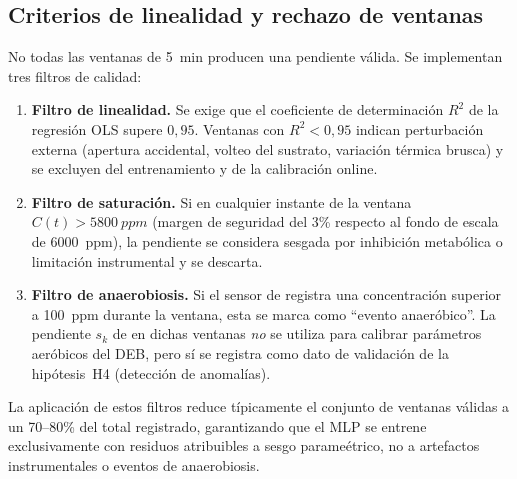 \subsection{Criterios de linealidad y rechazo de ventanas}

No todas las ventanas de \SI{5}{\minute} producen una pendiente válida. Se implementan tres filtros de calidad:

\begin{enumerate}
\item \textbf{Filtro de linealidad.} Se exige que el coeficiente de determinación $R^2$ de la regresión OLS supere $0{,}95$. Ventanas con $R^2 < 0{,}95$ indican perturbación externa (apertura accidental, volteo del sustrato, variación térmica brusca) y se excluyen del entrenamiento y de la calibración online.
\item \textbf{Filtro de saturación.} Si en cualquier instante de la ventana $C(t) > \SI{5800}{ppm}$ (margen de seguridad del 3\% respecto al fondo de escala de \SI{6000}{ppm}), la pendiente se considera sesgada por inhibición metabólica o limitación instrumental y se descarta.
\item \textbf{Filtro de anaerobiosis.} Si el sensor de  registra una concentración superior a \SI{100}{ppm} durante la ventana, esta se marca como ``evento anaeróbico''. La pendiente $s_k$ de  en dichas ventanas \emph{no} se utiliza para calibrar parámetros aeróbicos del DEB, pero sí se registra como dato de validación de la hipótesis~H4 (detección de anomalías).
\end{enumerate}

La aplicación de estos filtros reduce típicamente el conjunto de ventanas válidas a un 70--80\% del total registrado, garantizando que el MLP se entrene exclusivamente con residuos atribuibles a sesgo parameétrico, no a artefactos instrumentales o eventos de anaerobiosis.
